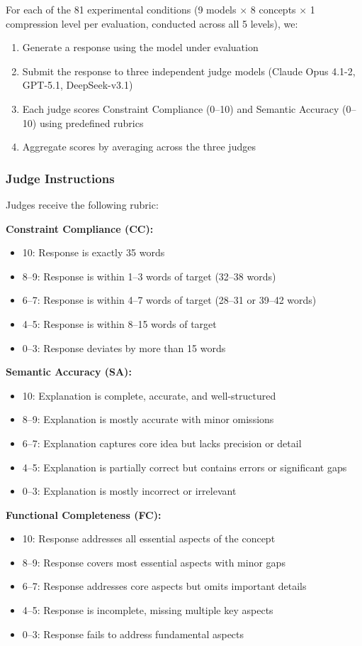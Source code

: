 \documentclass[11pt]{article}
\begin{document}
For each of the 81 experimental conditions (9 models $\times$ 8 concepts $\times$ 1 compression level per evaluation, conducted across all 5 levels), we:

\begin{enumerate}
\item Generate a response using the model under evaluation
\item Submit the response to three independent judge models (Claude Opus 4.1-2, GPT-5.1, DeepSeek-v3.1)
\item Each judge scores Constraint Compliance (0--10) and Semantic Accuracy (0--10) using predefined rubrics
\item Aggregate scores by averaging across the three judges
\end{enumerate}

\subsubsection{Judge Instructions}

Judges receive the following rubric:

\textbf{Constraint Compliance (CC):}
\begin{itemize}
\item 10: Response is exactly 35 words
\item 8--9: Response is within 1--3 words of target (32--38 words)
\item 6--7: Response is within 4--7 words of target (28--31 or 39--42 words)
\item 4--5: Response is within 8--15 words of target
\item 0--3: Response deviates by more than 15 words
\end{itemize}

\textbf{Semantic Accuracy (SA):}
\begin{itemize}
\item 10: Explanation is complete, accurate, and well-structured
\item 8--9: Explanation is mostly accurate with minor omissions
\item 6--7: Explanation captures core idea but lacks precision or detail
\item 4--5: Explanation is partially correct but contains errors or significant gaps
\item 0--3: Explanation is mostly incorrect or irrelevant
\end{itemize}

\textbf{Functional Completeness (FC):}
\begin{itemize}
\item 10: Response addresses all essential aspects of the concept
\item 8--9: Response covers most essential aspects with minor gaps
\item 6--7: Response addresses core aspects but omits important details
\item 4--5: Response is incomplete, missing multiple key aspects
\item 0--3: Response fails to address fundamental aspects
\end{itemize}
\end{document}
